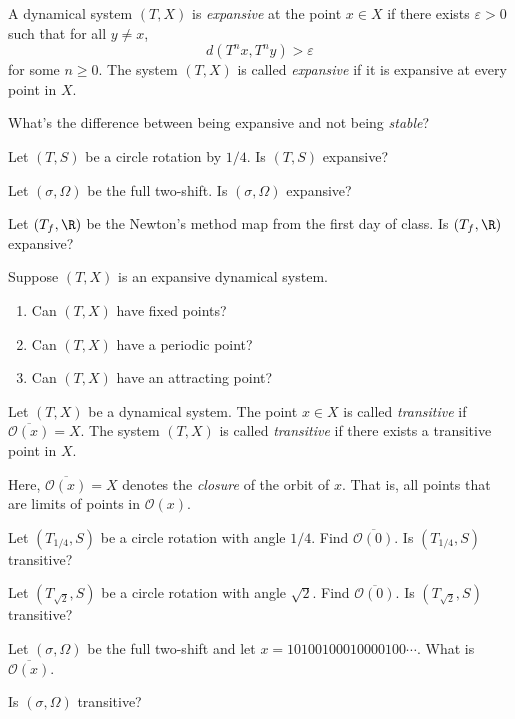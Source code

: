 	\newpage
	\begin{definition}[Expansive]
		A dynamical system $(T,X)$ is \emph{expansive} at the point $x\in X$ if there exists $\varepsilon>0$
		such that for all $y\neq x$,
		\[
			d(T^nx,T^ny) > \varepsilon
		\]
		for some $n\geq 0$. The system $(T,X)$ is called \emph{expansive} if it is expansive at every point in $X$.
	\end{definition}
	\question
	\begin{parts}
		\item What's the difference between being expansive and not being \emph{stable}?
		\item Let $(T,S)$ be a circle rotation by $1/4$. Is $(T,S)$ expansive?
		\item Let $(\sigma, \Omega)$ be the full two-shift. Is $(\sigma, \Omega)$ expansive?
		\item Let $(T_f, \R)$ be the Newton's method map from the first day of class. Is $(T_f,\R)$
			expansive?
		\item Suppose $(T,X)$ is an expansive dynamical system.
		\begin{enumerate}
			\item Can $(T,X)$ have fixed points?
			\item Can $(T,X)$ have a periodic point?
			\item Can $(T,X)$ have an attracting point?
		\end{enumerate}
	\end{parts}



	\newpage
	\begin{definition}[Transitivity]
		Let $(T,X)$ be a dynamical system. The point $x\in X$ is called \emph{transitive}
		if $\overline{\mathcal O(x)}=X$. The system $(T,X)$ is called \emph{transitive}
		if there exists a transitive point in $X$.
	\end{definition}
	Here, $\overline{\mathcal O(x)}=X$ denotes the \emph{closure} of the orbit of $x$. That is,
	all points that are limits of points in $\mathcal O(x)$.
	
	\question
	\begin{parts}
		\item Let $(T_{1/4},S)$ be a circle rotation with angle $1/4$. Find $\overline{\mathcal O(0)}$.
			Is $(T_{1/4},S)$ transitive?
		\item Let $(T_{\sqrt{2}},S)$ be a circle rotation with angle $\sqrt{2}$. Find $\overline{\mathcal O(0)}$.
			Is $(T_{\sqrt{2}},S)$ transitive?
		\item Let $(\sigma, \Omega)$ be the full two-shift and let $x=10100100010000100\cdots$. What is 
			$\overline{\mathcal O(x)}$.
		\item Is $(\sigma,\Omega)$ transitive?
	\end{parts}

